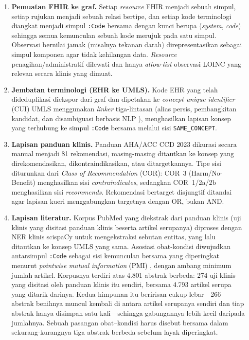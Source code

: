 \begin{enumerate}
    \item \textbf{Pemuatan FHIR ke graf.} Setiap \emph{resource} FHIR menjadi sebuah simpul,
    setiap rujukan menjadi sebuah relasi bertipe, dan setiap kode terminologi diangkat menjadi
    simpul \texttt{:Code} bersama dengan kunci berupa (\emph{system}, \emph{code}) sehingga semua
    kemunculan sebuah kode merujuk pada satu simpul. Observasi bernilai jamak (misalnya
    tekanan darah) direpresentasikan sebagai simpul komponen agar tidak kehilangan data.
    \emph{Resource} penagihan/administratif dilewati dan hanya \emph{allow-list} observasi LOINC
    yang relevan secara klinis yang dimuat.

    \item \textbf{Jembatan terminologi (EHR ke UMLS).} Kode EHR yang telah dideduplikasi
    diekspor dari graf dan dipetakan ke \emph{concept unique identifier} (CUI) UMLS
    \cite{umls} menggunakan \emph{linker} tiga-lintasan (alias persis, pembangkitan kandidat,
    dan disambiguasi berbasis NLP \cite{scispacy}), menghasilkan lapisan konsep yang terhubung
    ke simpul \texttt{:Code} bersama melalui sisi \texttt{SAME\_CONCEPT}.

    \item \textbf{Lapisan panduan klinis.} Panduan AHA/ACC CCD 2023 dikurasi secara manual menjadi
    81 rekomendasi, masing-masing ditautkan ke konsep yang direkomendasikan,
    dikontraindikasikan, atau ditargetkannya. Tipe sisi diturunkan dari \emph{Class of
    Recommendation} (COR): COR~3 (Harm/No-Benefit) menghasilkan sisi \emph{contraindicates},
    sedangkan COR~1/2a/2b menghasilkan sisi \emph{recommends}. Rekomendasi bertarget
    disjungtif ditandai agar lapisan kueri menggabungkan targetnya dengan OR, bukan AND.

    \item \textbf{Lapisan literatur.} Korpus PubMed yang diekstrak dari panduan klinis (uji klinis
    yang disitasi panduan klinis beserta artikel serupanya) diproses dengan NER klinis scispaCy untuk
    mengekstraksi sebutan entitas, yang lalu ditautkan ke konsep UMLS yang sama. Asosiasi
    obat-kondisi diwujudkan antarsimpul \texttt{:Code} sebagai sisi kemunculan bersama yang
    diperingkat menurut \emph{pointwise mutual information} (PMI) \cite{pmi}, dengan ambang
    minimum jumlah artikel.
    Korpusnya terdiri atas 4.801 abstrak berbeda: 274 uji klinis yang disitasi oleh
    panduan klinis itu sendiri, bersama 4.793 artikel serupa yang ditarik darinya. Kedua himpunan itu
    beririsan cukup lebar---266 abstrak benihnya muncul kembali di antara artikel serupanya
    sendiri dan tiap abstrak hanya disimpan satu kali---sehingga gabungannya lebih kecil
    daripada jumlahnya. Sebuah pasangan obat--kondisi harus disebut bersama dalam
    sekurang-kurangnya tiga abstrak berbeda sebelum layak diperingkat.
\end{enumerate}

